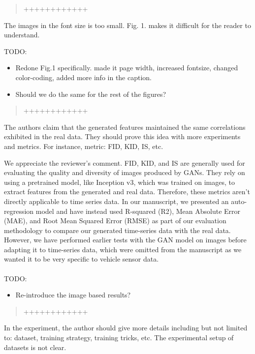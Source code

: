 \documentclass{article}
\begin{document}
\begin{quote}
	++++++++++++
\end{quote}

\RC The images in the font size is too small. Fig. 1. makes it difficult for the reader to understand.

\AR TODO: 
\begin{itemize}
    \item Redone Fig.1 specifically. made it page width, increased fontsize, changed color-coding, added more info in the caption.
    \item Should we do the same for the rest of the figures?
\end{itemize}

\begin{quote}
	++++++++++++
\end{quote}

\RC The authors claim that the generated features maintained the same correlations exhibited in the real data. They should prove this idea with more experiments and metrics. For instance, metric: FID, KID, IS, etc.

\AR We appreciate the reviewer's comment. FID, KID, and IS are generally used for evaluating the quality and diversity of images produced by GANs. They rely on using a pretrained model, like Inception v3, which was trained on images, to extract features from the generated and real data. Therefore, these metrics aren't directly applicable to time series data. In our manuscript, we presented an auto-regression model and have instead used R-squared (R2), Mean Absolute Error (MAE), and Root Mean Squared Error (RMSE) as part of our evaluation methodology to compare our generated time-series data with the real data. However, we have performed earlier tests with the GAN model on images before adapting it to time-series data, which were omitted from the manuscript as we wanted it to be very specific to vehicle sensor data.
\\
\\
TODO: 
\begin{itemize}
    \item Re-introduce the image based results?
\end{itemize}

\begin{quote}
	++++++++++++
\end{quote}

\RC In the experiment, the author should give more details including but not limited to: dataset, training strategy, training tricks, etc. The experimental setup of datasets is not clear.
\end{document}
